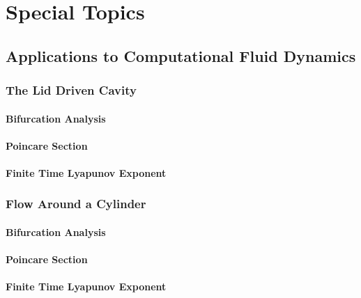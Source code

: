 \documentclass{amsbook}
\begin{document}
\chapter{Special Topics}

\section{Applications to Computational Fluid Dynamics}

\subsection{The Lid Driven Cavity}
\subsubsection{Bifurcation Analysis}
\subsubsection{Poincare Section}
\subsubsection{Finite Time Lyapunov Exponent}

\subsection{Flow Around a Cylinder}
\subsubsection{Bifurcation Analysis}
\subsubsection{Poincare Section}
\subsubsection{Finite Time Lyapunov Exponent}


\end{document}
